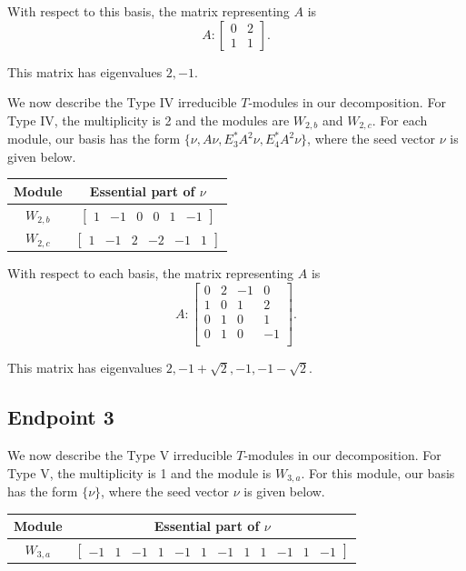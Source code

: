 \documentclass[12pt,letterpaper]{article}
\newcommand{\rowvector}[1]{\begin{bmatrix} #1 \end{bmatrix}}
\begin{document}
With respect to this basis, the matrix representing $A$ is
\begin{equation}
    A: \begin{bmatrix}
  0 & 2 \\
  1 & 1
\end{bmatrix}.
\label{eq:cox-III}
\end{equation}

This matrix has eigenvalues $2, -1$.

We now describe the Type IV irreducible $T$-modules in our decomposition. For Type IV, the multiplicity is 2 and the modules are $W_{2,b}$ and $W_{2,c}$. For each module, our basis has the form $\{\nu, A\nu, E_3^*A^2\nu,E_4^*A^2\nu\}$, where the seed vector $\nu$ is given below.
\begin{center}
    \begin{tabular}{c | c}
    \toprule
       \textbf{Module}  & \textbf {Essential part of }$\nu$ \\
       \midrule
       $W_{2,b}$  & $\rowvector{1 & -1 & 0 & 0 & 1 & -1}$ \\[1.67pt]
       $W_{2,c}$  & $\rowvector{1 & -1 & 2 & -2 & -1 & 1}$ \\
    \bottomrule
    \end{tabular}
\end{center}

With respect to each basis, the matrix representing $A$ is 
\begin{equation}
    A: \begin{bmatrix}
  0 & 2 & -1 & 0 \\
  1 & 0 & 1 & 2 \\
  0 & 1 & 0 & 1 \\
  0 & 1 & 0 & -1 \\
\end{bmatrix}.
\label{eq:cox-IV}
\end{equation}

This matrix has eigenvalues $2, -1 + \sqrt2, -1, -1-\sqrt2$.

\subsection{Endpoint 3}

We now describe the Type V irreducible $T$-modules in our decomposition. For Type V, the multiplicity is 1 and the module is  $W_{3,a}$. For this module, our basis has the form $\{\nu\}$, where the seed vector $\nu$ is given below.
\begin{center}
    \begin{tabular}{c | c}
    \toprule
       \textbf{Module}  & \textbf {Essential part of }$\nu$ \\
       \midrule
       $W_{3,a}$  & $\rowvector{-1 & 1 & -1 & 1 & -1 & 1 & -1 & 1 & 1 & -1 & 1 & -1}$ \\
    \bottomrule
    \end{tabular}
\end{center}
\end{document}
